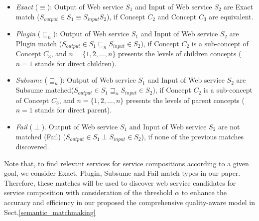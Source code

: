 \documentclass{llncs}
\begin{document}
\begin{itemize}
\item \textit{Exact} ($\equiv$): Output of Web service $S_{1}$ and Input of Web service $S_{2}$ are Exact match ($ S_{output} \in S_{1} \equiv S_{input}S_{2}$), if  Concept $C_{2}$ and Concept $C_{3}$ are equivalent.
\item \textit{Plugin} ($\sqsubseteq_{n}$): Output of Web service $S_{1}$ and Input of Web service $S_{2}$ are Plugin match ($S_{output} \in S_{1} \sqsubseteq_{n} S_{input} \in S_{2}$), if  Concept $C_{2}$ is a sub-concept of Concept $C_{3}$, and $n = \{1,2,...,n \}$ presents the levels of children concepts ($n=1$ stands for direct children).
\item \textit{Subsume} ($\sqsupseteq_{n}$): Output of Web service $S_{1}$ and Input of Web service $S_{2}$ are Subsume matched($S_{output} \in S_{1} \sqsupseteq_{n} S_{input} \in S_{2}$), if  Concept $C_{2}$ is a sub-concept of  Concept $C_{3}$, and $n = \{1,2,...,n \}$ presents the levels of parent concepts ($n=1$ stands for direct parent).
\item \textit{Fail} ($\perp$). Output of Web service $S_{1}$ and Input of Web service $S_{2}$ are not matched (Fail) ($S_{output} \in S_{1} \perp S_{input} \in S_{2}$), if none of the previous matches discovered.
\end{itemize}

Note that, to find relevant services for service compositions according to a given goal, we consider Exact, Plugin, Subsume and Fail match types in our paper. Therefore, these matches will be used to discover web service candidates for service composition with consideration of the threshold $\alpha$ to enhance the accuracy and efficiency in our proposed the comprehensive quality-aware model in Sect.\ref{semantic_matchmaking}
\end{document}
